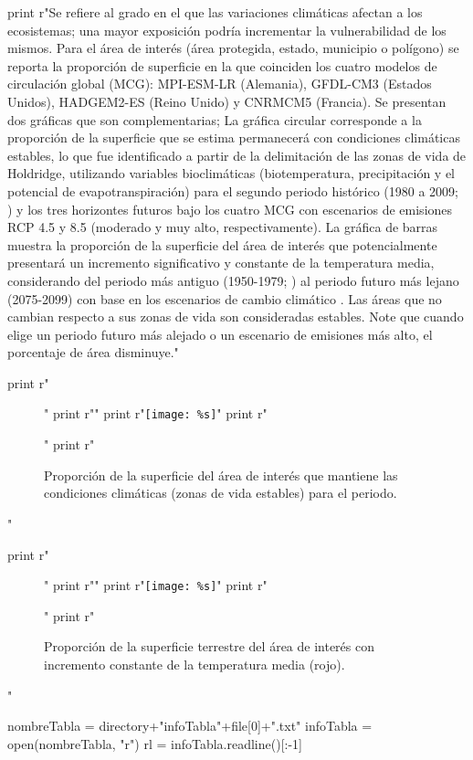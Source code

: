 \documentclass{article}
\begin{document}
\begin{python}
{{		      print r"Se refiere al grado en el que las variaciones clim\'aticas afectan a los ecosistemas; una mayor exposici\'on podr\'ia incrementar la vulnerabilidad de los mismos. Para el \'area de inter\'es (\'area protegida, estado, municipio o pol\'igono) se reporta la proporci\'on de superficie en la que coinciden los cuatro modelos de circulaci\'on global (MCG): MPI-ESM-LR (Alemania), GFDL-CM3 (Estados Unidos), HADGEM2-ES (Reino Unido) y CNRMCM5 (Francia). Se presentan dos gr\'aficas que son complementarias; La gr\'afica circular corresponde a la proporci\'on de la superficie que se estima permanecer\'a con condiciones clim\'aticas estables, lo que fue identificado a partir de la delimitaci\'on de las zonas de vida de Holdridge, utilizando variables bioclim\'aticas (biotemperatura, precipitaci\'on y el potencial de evapotranspiraci\'on) para el segundo periodo hist\'orico (1980 a 2009; \cite{Cuervo191}) y los tres horizontes futuros bajo los cuatro MCG con escenarios de emisiones RCP 4.5 y 8.5 (moderado y muy alto, respectivamente). La gr\'afica de barras muestra la proporci\'on de la superficie del \'area de inter\'es que potencialmente presentar\'a un incremento significativo y constante de la temperatura media, considerando del periodo m\'as antiguo (1950-1979; \cite{Cuervo19}) al periodo futuro m\'as lejano (2075-2099) con base en los escenarios de cambio clim\'atico \cite{Fernandez15}. Las \'areas que no cambian respecto a sus zonas de vida son consideradas estables. Note que cuando elige un periodo futuro m\'as alejado o un escenario de emisiones m\'as alto, el porcentaje de \'area disminuye."

		      print r"\begin{figure}[H]"
		      print r"\centering"
		      print r"\texttt{[image: \%s]}" %
		      print r"\caption{Proporci\'on de la superficie del \'area de inter\'es que mantiene las condiciones clim\'aticas (zonas de vida estables) para el periodo.}"
		      print r"\end{figure}"
		      
		      print r"\begin{figure}[H]"
		      print r"\centering"
		      print r"\texttt{[image: \%s]}" %
		      print r"\caption{Proporci\'on de la superficie terrestre del \'area de inter\'es con incremento constante de la temperatura media (rojo).}"
		      print r"\end{figure}"

		      nombreTabla = directory+"infoTabla"+file[0]+".txt"
		      infoTabla = open(nombreTabla, "r")
		      rl = infoTabla.readline()[:-1]
		      
}}
\end{python}
\end{document}

